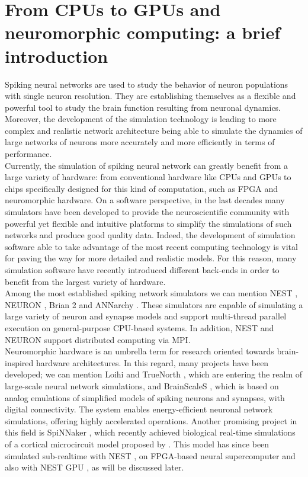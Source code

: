 \documentclass[a4paper, 12pt, twoside, openright]{book}
\begin{document}
\section{From CPUs to GPUs and neuromorphic computing: a brief introduction}
Spiking neural networks are used to study the behavior of neuron populations with single neuron resolution. They are establishing themselves as a flexible and powerful tool to study the brain function resulting from neuronal dynamics. Moreover, the development of the simulation technology is leading to more complex and realistic network architecture being able to simulate the dynamics of large networks of neurons more accurately and more efficiently in terms of performance.\\
Currently, the simulation of spiking neural network can greatly benefit from a large variety of hardware: from conventional hardware like CPUs and GPUs to chips specifically designed for this kind of computation, such as FPGA and neuromorphic hardware. On a software perspective, in the last decades many simulators have been developed to provide the neuroscientific community with powerful yet flexible and intuitive platforms to simplify the simulations of such networks and produce good quality data. Indeed, the development of simulation software able to take advantage of the most recent computing technology is vital for paving the way for more detailed and realistic models. For this reason, many simulation software have recently introduced different back-ends in order to benefit from the largest variety of hardware.\\
Among the most established spiking network simulators we can mention NEST \cite{Gewaltig2007}, NEURON \cite{Carnevale_2006}, Brian 2 \cite{Stimberg2019} and ANNarchy \cite{Vitay2015}. 
These simulators are capable of simulating a large variety of neuron and synapse models and support multi-thread parallel execution on general-purpose CPU-based systems. In addition, NEST and NEURON support distributed computing via MPI.\\
Neuromorphic hardware is an umbrella term for research oriented towards brain-inspired hardware architectures. In this regard, many projects have been developed; we can mention Loihi \cite{Loihi2018} and TrueNorth \cite{TrueNorth2015}, which are entering the realm of large-scale neural network simulations, and BrainScaleS \cite{Grbl2020}, which is based on analog emulations of simplified models of spiking neurons and synapses, with digital connectivity. The system enables energy-efficient neuronal network simulations, offering highly accelerated operations. Another promising project in this field is SpiNNaker \cite{Furber2014}, which recently achieved biological real-time simulations of a cortical microcircuit model \cite{Rhodes2020} proposed by \cite{Potjans2012}. This model has since been simulated sub-realtime with NEST \cite{Kurth2022}, on FPGA-based neural supercomputer \cite{Heittmann2022, Kauth2023} and also with NEST GPU \cite{Golosio2023}, as will be discussed later.
\end{document}
